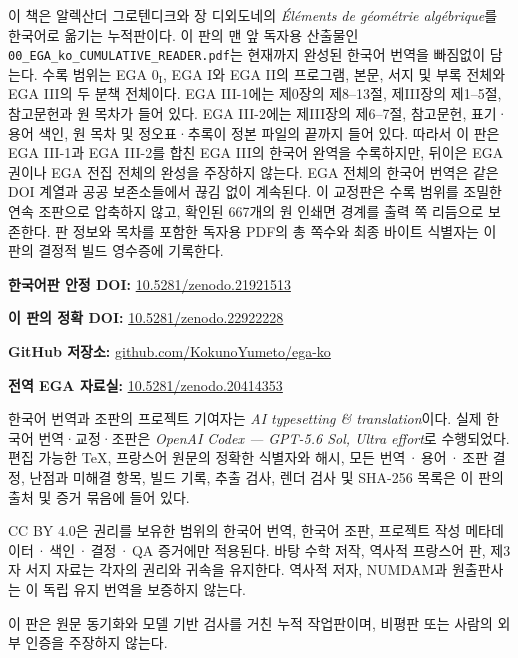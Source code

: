 \vspace{1.5em}
이 책은 알렉산더 그로텐디크와 장 디외도네의
\emph{Éléments de géométrie algébrique}를 한국어로 옮기는 누적판이다.
이 판의 맨 앞 독자용 산출물인
\texttt{00\_EGA\_ko\_CUMULATIVE\_READER.pdf}는 현재까지 완성된
한국어 번역을 빠짐없이 담는다. 수록 범위는 EGA $0_{\mathrm I}$,
EGA I와 EGA II의 프로그램, 본문, 서지 및 부록 전체와 EGA III의 두
분책 전체이다. EGA III-1에는 제0장의 제8--13절, 제III장의 제1--5절,
참고문헌과 원 목차가 들어 있다. EGA III-2에는 제III장의 제6--7절,
참고문헌, 표기·용어 색인, 원 목차 및 정오표·추록이 정본 파일의 끝까지
들어 있다. 따라서 이 판은 EGA III-1과 EGA III-2를 합친 EGA III의
한국어 완역을 수록하지만, 뒤이은 EGA 권이나 EGA 전집 전체의 완성을
주장하지 않는다. EGA 전체의 한국어 번역은 같은 DOI 계열과 공공
보존소들에서 끊김 없이 계속된다. 이 교정판은 수록 범위를 조밀한 연속
조판으로 압축하지 않고, 확인된 667개의 원 인쇄면 경계를 출력 쪽
리듬으로 보존한다. 판 정보와 목차를 포함한 독자용 PDF의 총 쪽수와
최종 바이트 식별자는 이 판의 결정적 빌드 영수증에 기록한다.

\medskip
\noindent\textbf{한국어판 안정 DOI:}
\href{https://doi.org/10.5281/zenodo.21921513}{10.5281/zenodo.21921513}

\smallskip
\noindent\textbf{이 판의 정확 DOI:}
\href{https://doi.org/10.5281/zenodo.22922228}{10.5281/zenodo.22922228}

\smallskip
\noindent\textbf{GitHub 저장소:}
\href{https://github.com/KokunoYumeto/ega-ko}{github.com/KokunoYumeto/ega-ko}

\smallskip
\noindent\textbf{전역 EGA 자료실:}
\href{https://doi.org/10.5281/zenodo.20414353}{10.5281/zenodo.20414353}

\medskip
한국어 번역과 조판의 프로젝트 기여자는
\emph{AI typesetting \& translation}이다. 실제 한국어 번역·교정·조판은
\emph{OpenAI Codex --- GPT-5.6 Sol, Ultra effort}로 수행되었다.
편집 가능한 TeX, 프랑스어 원문의 정확한 식별자와 해시, 모든 번역\,·\,용어\,·\,조판 결정,
난점과 미해결 항목, 빌드 기록, 추출 검사, 렌더 검사 및 SHA-256 목록은 이 판의
출처 및 증거 묶음에 들어 있다.

\medskip
CC BY 4.0은 권리를 보유한 범위의 한국어 번역, 한국어 조판,
프로젝트 작성 메타데이터\,·\,색인\,·\,결정\,·\,QA 증거에만 적용된다.
바탕 수학 저작, 역사적 프랑스어 판, 제3자 서지 자료는 각자의 권리와 귀속을 유지한다.
역사적 저자, NUMDAM과 원출판사는 이 독립 유지 번역을 보증하지 않는다.

\medskip
이 판은 원문 동기화와 모델 기반 검사를 거친
누적 작업판이며, 비평판 또는 사람의 외부 인증을 주장하지 않는다.

